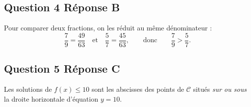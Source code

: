 \documentclass[10pt]{article}
\begin{document}
\subsection*{Question 4 \quad Réponse B}

Pour comparer deux fractions, on les réduit au même dénominateur :
\[\dfrac{7}{9} = \dfrac{49}{63} \quad\text{et}\quad \dfrac{5}{7} = \dfrac{45}{63},
\qquad\text{donc}\qquad \dfrac{7}{9} > \dfrac{5}{7}.\]


\subsection*{Question 5 \quad Réponse C}

Les solutions de $f(x) \leqslant 10$ sont les abscisses des points de $\mathcal{C}$ situés
\emph{sur ou sous} la droite horizontale d'équation $y = 10$.
\end{document}
